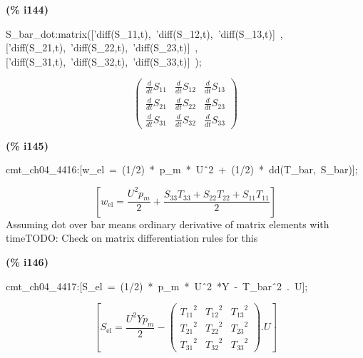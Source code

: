 \documentclass[fleqn]{article}
\begin{document}
\noindent
\begin{minipage}[t]{4.000000em}\color{red}\bfseries
(\% i144)	
\end{minipage}
\begin{minipage}[t]{\textwidth}\color{blue}
S\_bar\_dot:matrix(['diff(S\_11,t),\ 'diff(S\_12,t),\ 'diff(S\_13,t)]\ ,['diff(S\_21,t),\ 'diff(S\_22,t),\ 'diff(S\_23,t)]\ ,['diff(S\_31,t),\ 'diff(S\_32,t),\ 'diff(S\_33,t)]\ );
\end{minipage}
\[\displaystyle \tag{\% o144} 
\begin{pmatrix}\frac{d}{d t} {S_{\ensuremath{\mathrm{11}}}} & \frac{d}{d t} {S_{\ensuremath{\mathrm{12}}}} & \frac{d}{d t} {S_{\ensuremath{\mathrm{13}}}}\\
\frac{d}{d t} {S_{\ensuremath{\mathrm{21}}}} & \frac{d}{d t} {S_{\ensuremath{\mathrm{22}}}} & \frac{d}{d t} {S_{\ensuremath{\mathrm{23}}}}\\
\frac{d}{d t} {S_{\ensuremath{\mathrm{31}}}} & \frac{d}{d t} {S_{\ensuremath{\mathrm{32}}}} & \frac{d}{d t} {S_{\ensuremath{\mathrm{33}}}}\end{pmatrix}\mbox{}
\]


\noindent
\begin{minipage}[t]{4.000000em}\color{red}\bfseries
(\% i145)	
\end{minipage}
\begin{minipage}[t]{\textwidth}\color{blue}
cmt\_ch04\_4416:[w\_el\ =\ (1/2)\ *\ p\_m\ *\ U\^\ 2\ +\ (1/2)\ *\ dd(T\_bar,\ S\_bar)];
\end{minipage}
\[\displaystyle \tag{\% o145} 
\left[ {w_{\ensuremath{\mathrm{el}}}}=\frac{{{U}^{2}} {p_m}}{2}+\frac{{S_{\ensuremath{\mathrm{33}}}} {T_{\ensuremath{\mathrm{33}}}}+{S_{\ensuremath{\mathrm{22}}}} {T_{\ensuremath{\mathrm{22}}}}+{S_{\ensuremath{\mathrm{11}}}} {T_{\ensuremath{\mathrm{11}}}}}{2}\right] \mbox{}
\]
Assuming dot over bar means ordinary derivative of matrix elements with timeTODO: Check on matrix differentiation rules for this


\noindent
\begin{minipage}[t]{4.000000em}\color{red}\bfseries
(\% i146)	
\end{minipage}
\begin{minipage}[t]{\textwidth}\color{blue}
cmt\_ch04\_4417:[S\_el\ =\ (1/2)\ *\ p\_m\ *\ U\^\ 2\ *Y\ -\ T\_bar\^\ 2\ .\ U];
\end{minipage}
\[\displaystyle \tag{\% o146} 
\left[ {S_{\ensuremath{\mathrm{el}}}}=\frac{{{U}^{2}} Y {p_m}}{2}-\begin{pmatrix}{{{T_{\ensuremath{\mathrm{11}}}}}^{2}} & {{{T_{\ensuremath{\mathrm{12}}}}}^{2}} & {{{T_{\ensuremath{\mathrm{13}}}}}^{2}}\\
{{{T_{\ensuremath{\mathrm{21}}}}}^{2}} & {{{T_{\ensuremath{\mathrm{22}}}}}^{2}} & {{{T_{\ensuremath{\mathrm{23}}}}}^{2}}\\
{{{T_{\ensuremath{\mathrm{31}}}}}^{2}} & {{{T_{\ensuremath{\mathrm{32}}}}}^{2}} & {{{T_{\ensuremath{\mathrm{33}}}}}^{2}}\end{pmatrix}\ensuremath{\mathrm{ . }}U\right] \mbox{}
\]
\end{document}
